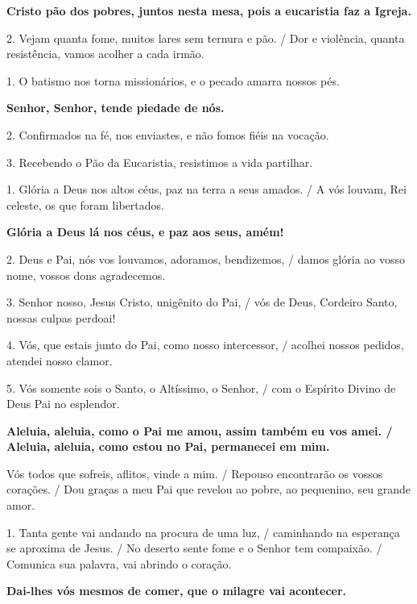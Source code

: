 \documentclass[a5paper,9pt]{extarticle}
\begin{document}
\begin{cantos}
\begin{canto}
\textbf{Cristo pão dos pobres, juntos nesta mesa, pois a eucaristia faz a Igreja. }

2. Vejam quanta fome, muitos lares sem ternura e pão. / Dor e violência, quanta resistência, vamos acolher a cada irmão.
\end{canto}

\begin{canto}
1. O batismo nos torna missionários, e o pecado amarra nossos pés.

\textbf{Senhor, Senhor, tende piedade de nós. }

2. Confirmados na fé, nos enviastes, e não fomos fiéis na vocação.

3. Recebendo o Pão da Eucaristia, resistimos a vida partilhar.
\end{canto}

\begin{canto}
1. Glória a Deus nos altos céus, paz na terra a seus amados. / A vós louvam, Rei celeste, os que foram libertados.

\textbf{Glória a Deus lá nos céus, e paz aos seus, amém!}

2. Deus e Pai, nós vos louvamos, adoramos, bendizemos, / damos glória ao vosso nome, vossos dons agradecemos.

3. Senhor nosso, Jesus Cristo, unigênito do Pai, / vós de Deus, Cordeiro Santo, nossas culpas perdoai!

4. Vós, que estais junto do Pai, como nosso intercessor, / acolhei nossos pedidos, atendei nosso clamor.

5. Vós somente sois o Santo, o Altíssimo, o Senhor, / com o Espírito Divino de Deus Pai no esplendor.
\end{canto}

\begin{canto}
\textbf{Aleluia, aleluia, como o Pai me amou, assim também eu vos amei. / Aleluia, aleluia, como estou no Pai, permanecei em mim.}

Vós todos que sofreis, aflitos, vinde a mim. / Repouso encontrarão os vossos corações. / Dou graças a meu Pai que revelou ao pobre, ao pequenino, seu grande amor.
\end{canto}

\begin{canto}
1. Tanta gente vai andando na procura de uma luz, / caminhando na esperança se aproxima de Jesus. / No deserto sente fome e o Senhor tem compaixão. / Comunica sua palavra, vai abrindo o coração.

\textbf{Dai-lhes vós mesmos de comer, que o milagre vai acontecer. }


\end{canto}
\end{cantos}
\end{document}
